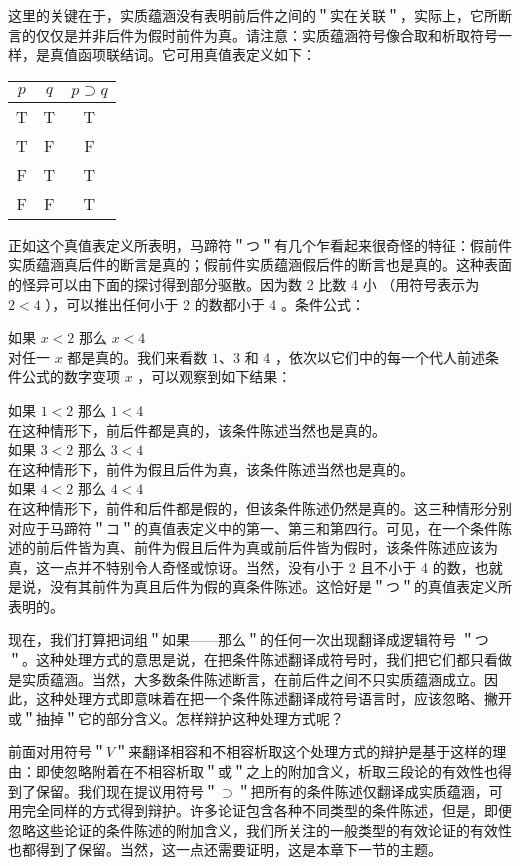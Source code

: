 这里的关键在于，实质蕴涵没有表明前后件之间的＂实在关联＂，实际上，它所断言的仅仅是并非后件为假时前件为真。请注意：实质蕴涵符号像合取和析取符号一样，是真值函项联结词。它可用真值表定义如下：

\begin{center}
\begin{tabular}{|ccc|}
\hline
$p$ & $q$ & $p \supset q$ \\
\hline
T & T & T \\
T & F & F \\
F & T & T \\
F & F & T \\
\hline
\end{tabular}
\end{center}

正如这个真值表定义所表明，马蹄符＂つ＂有几个乍看起来很奇怪的特征：假前件实质蕴涵真后件的断言是真的；假前件实质蕴涵假后件的断言也是真的。这种表面的怪异可以由下面的探讨得到部分驱散。因为数 2 比数 4 小 （用符号表示为 $2<4$ ），可以推出任何小于 2 的数都小于 4 。条件公式：

如果 $x<2$ 那么 $x<4$\\
对任一 $x$ 都是真的。我们来看数 $1 、 3$ 和 4 ，依次以它们中的每一个代人前述条件公式的数字变项 $x$ ，可以观察到如下结果：

如果 $1<2$ 那么 $1<4$\\
在这种情形下，前后件都是真的，该条件陈述当然也是真的。\\
如果 $3<2$ 那么 $3<4$\\
在这种情形下，前件为假且后件为真，该条件陈述当然也是真的。\\
如果 $4<2$ 那么 $4<4$\\
在这种情形下，前件和后件都是假的，但该条件陈述仍然是真的。这三种情形分别对应于马蹄符＂コ＂的真值表定义中的第一、第三和第四行。可见，在一个条件陈述的前后件皆为真、前件为假且后件为真或前后件皆为假时，该条件陈述应该为真，这一点并不特别令人奇怪或惊讶。当然，没有小于 2 且不小于 4 的数，也就是说，没有其前件为真且后件为假的真条件陈述。这恰好是＂つ＂的真值表定义所表明的。

现在，我们打算把词组＂如果——那么＂的任何一次出现翻译成逻辑符号 ＂つ＂。这种处理方式的意思是说，在把条件陈述翻译成符号时，我们把它们都只看做是实质蕴涵。当然，大多数条件陈述断言，在前后件之间不只实质蕴涵成立。因此，这种处理方式即意味着在把一个条件陈述翻译成符号语言时，应该忽略、撇开或＂抽掉＂它的部分含义。怎样辩护这种处理方式呢？

前面对用符号＂$V$＂来翻译相容和不相容析取这个处理方式的辩护是基于这样的理由：即使忽略附着在不相容析取＂或＂之上的附加含义，析取三段论的有效性也得到了保留。我们现在提议用符号＂$\supset$＂把所有的条件陈述仅翻译成实质蕴涵，可用完全同样的方式得到辩护。许多论证包含各种不同类型的条件陈述，但是，即便忽略这些论证的条件陈述的附加含义，我们所关注的一般类型的有效论证的有效性也都得到了保留。当然，这一点还需要证明，这是本章下一节的主题。

